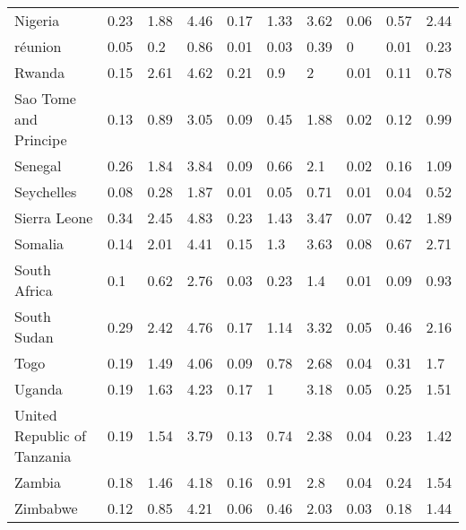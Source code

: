 \begin{longtable}[t]{llllllllll}
Nigeria & 0.23 & 1.88 & 4.46 & 0.17 & 1.33 & 3.62 & 0.06 & 0.57 & 2.44\\
réunion & 0.05 & 0.2 & 0.86 & 0.01 & 0.03 & 0.39 & 0 & 0.01 & 0.23\\
Rwanda & 0.15 & 2.61 & 4.62 & 0.21 & 0.9 & 2 & 0.01 & 0.11 & 0.78\\
Sao Tome and Principe & 0.13 & 0.89 & 3.05 & 0.09 & 0.45 & 1.88 & 0.02 & 0.12 & 0.99\\
Senegal & 0.26 & 1.84 & 3.84 & 0.09 & 0.66 & 2.1 & 0.02 & 0.16 & 1.09\\
Seychelles & 0.08 & 0.28 & 1.87 & 0.01 & 0.05 & 0.71 & 0.01 & 0.04 & 0.52\\
Sierra Leone & 0.34 & 2.45 & 4.83 & 0.23 & 1.43 & 3.47 & 0.07 & 0.42 & 1.89\\
Somalia & 0.14 & 2.01 & 4.41 & 0.15 & 1.3 & 3.63 & 0.08 & 0.67 & 2.71\\
South Africa & 0.1 & 0.62 & 2.76 & 0.03 & 0.23 & 1.4 & 0.01 & 0.09 & 0.93\\
South Sudan & 0.29 & 2.42 & 4.76 & 0.17 & 1.14 & 3.32 & 0.05 & 0.46 & 2.16\\
Togo & 0.19 & 1.49 & 4.06 & 0.09 & 0.78 & 2.68 & 0.04 & 0.31 & 1.7\\
Uganda & 0.19 & 1.63 & 4.23 & 0.17 & 1 & 3.18 & 0.05 & 0.25 & 1.51\\
United Republic of Tanzania & 0.19 & 1.54 & 3.79 & 0.13 & 0.74 & 2.38 & 0.04 & 0.23 & 1.42\\
Zambia & 0.18 & 1.46 & 4.18 & 0.16 & 0.91 & 2.8 & 0.04 & 0.24 & 1.54\\
Zimbabwe & 0.12 & 0.85 & 4.21 & 0.06 & 0.46 & 2.03 & 0.03 & 0.18 & 1.44\\*
\end{longtable}
\endgroup{}
